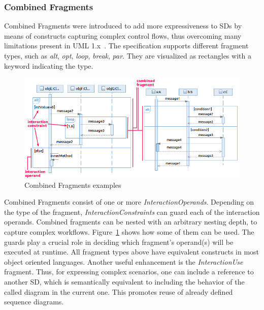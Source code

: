 \documentclass[letter]{llncs}
\newcommand{\figshrink}{\vspace{-.6cm}}
\newcommand{\figshrinkend}{}
\begin{document}
\subsubsection{Combined Fragments}
\label{sec:CombinedFragments}
\vspace{-24 pt}
Combined Fragments were introduced to add more expressiveness to SDs by 
means of constructs capturing complex control flows, thus overcoming many limitations 
present in UML 1.x~\cite{UML2.4}. The specification supports different fragment types,
such as \emph{alt}, \emph{opt}, \emph{loop}, \emph{break}, \emph{par}.
They are visualized as rectangles with a keyword
indicating the type.
\begin{figure}[!b]
\centering
\figshrink
\includegraphics[width=1.0\linewidth,keepaspectratio=true]{./Figure2_final.png}
\caption{Combined Fragments examples}
\label{fig:example2}
\figshrinkend
\end{figure}
Combined Fragments consist of one or more \emph{InteractionOperands}. Depending on the type
of the fragment, \emph{InteractionConstraints} can guard each of the interaction operands.
Combined fragments can be nested with an arbitrary nesting depth, to capture complex workflows. Figure~\ref{fig:example2}
shows how some of them can be used. The guards play a crucial role in deciding which fragment's operand(s) will
be executed at runtime.
All fragment types above have equivalent constructs in most object oriented languages. 
Another useful enhancement is the \emph{InteractionUse} fragment. Thus, for expressing
complex scenarios, one can include a reference to another SD, which is semantically
equivalent to including the behavior of the called diagram in the current one. This promotes reuse of already defined
sequence diagrams. 
\vspace{-9 pt}
\end{document}
